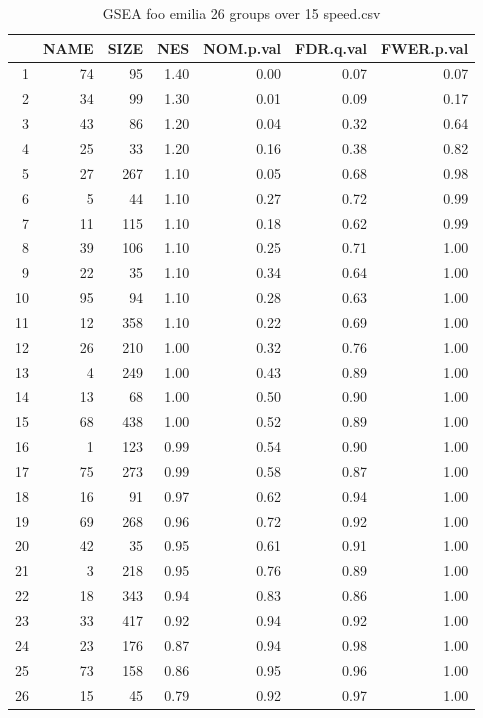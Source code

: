 \begin{table}[ht]
\centering
\begin{tabular}{rrrrrrr}
  \hline
 & NAME & SIZE & NES & NOM.p.val & FDR.q.val & FWER.p.val \\ 
  \hline
1 &  74 &  95 & 1.40 & 0.00 & 0.07 & 0.07 \\ 
  2 &  34 &  99 & 1.30 & 0.01 & 0.09 & 0.17 \\ 
  3 &  43 &  86 & 1.20 & 0.04 & 0.32 & 0.64 \\ 
  4 &  25 &  33 & 1.20 & 0.16 & 0.38 & 0.82 \\ 
  5 &  27 & 267 & 1.10 & 0.05 & 0.68 & 0.98 \\ 
  6 &   5 &  44 & 1.10 & 0.27 & 0.72 & 0.99 \\ 
  7 &  11 & 115 & 1.10 & 0.18 & 0.62 & 0.99 \\ 
  8 &  39 & 106 & 1.10 & 0.25 & 0.71 & 1.00 \\ 
  9 &  22 &  35 & 1.10 & 0.34 & 0.64 & 1.00 \\ 
  10 &  95 &  94 & 1.10 & 0.28 & 0.63 & 1.00 \\ 
  11 &  12 & 358 & 1.10 & 0.22 & 0.69 & 1.00 \\ 
  12 &  26 & 210 & 1.00 & 0.32 & 0.76 & 1.00 \\ 
  13 &   4 & 249 & 1.00 & 0.43 & 0.89 & 1.00 \\ 
  14 &  13 &  68 & 1.00 & 0.50 & 0.90 & 1.00 \\ 
  15 &  68 & 438 & 1.00 & 0.52 & 0.89 & 1.00 \\ 
  16 &   1 & 123 & 0.99 & 0.54 & 0.90 & 1.00 \\ 
  17 &  75 & 273 & 0.99 & 0.58 & 0.87 & 1.00 \\ 
  18 &  16 &  91 & 0.97 & 0.62 & 0.94 & 1.00 \\ 
  19 &  69 & 268 & 0.96 & 0.72 & 0.92 & 1.00 \\ 
  20 &  42 &  35 & 0.95 & 0.61 & 0.91 & 1.00 \\ 
  21 &   3 & 218 & 0.95 & 0.76 & 0.89 & 1.00 \\ 
  22 &  18 & 343 & 0.94 & 0.83 & 0.86 & 1.00 \\ 
  23 &  33 & 417 & 0.92 & 0.94 & 0.92 & 1.00 \\ 
  24 &  23 & 176 & 0.87 & 0.94 & 0.98 & 1.00 \\ 
  25 &  73 & 158 & 0.86 & 0.95 & 0.96 & 1.00 \\ 
  26 &  15 &  45 & 0.79 & 0.92 & 0.97 & 1.00 \\ 
   \hline
\end{tabular}
\caption{GSEA foo emilia 26 groups over 15 speed.csv} 
\label{speed.csv}
\end{table}

